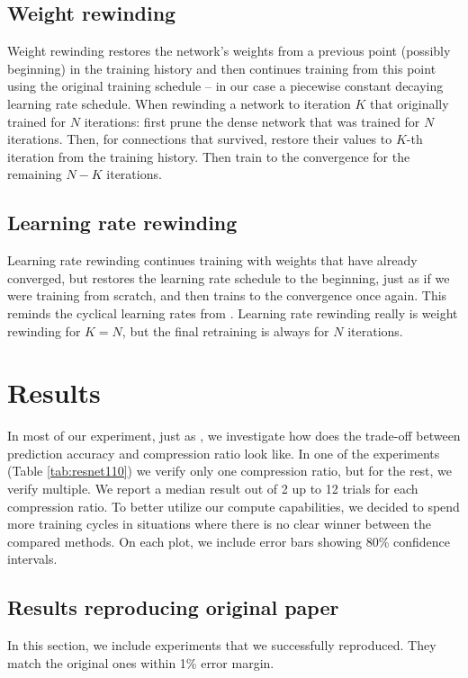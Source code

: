 \subsection{Weight rewinding}
Weight rewinding restores the network's weights from a previous point (possibly beginning) in the training history and then continues training from this point using the original training schedule -- in our case a piecewise constant decaying learning rate schedule.
When rewinding a network to iteration $K$ that originally trained for $N$ iterations: first prune the dense network that was trained for $N$ iterations. Then, for connections that survived, restore their values to $K$-th iteration from the training history. Then train to the convergence for the remaining $N-K$ iterations.

\subsection{Learning rate rewinding}
Learning rate rewinding continues training with weights that have already converged, but restores the learning rate schedule to the beginning, just as if we were training from scratch, and then trains to the convergence once again. This reminds the cyclical learning rates from \cite{cyclical}. Learning rate rewinding really is weight rewinding for $K = N$, but the final retraining is always for $N$ iterations.

\section{Results}
In most of our experiment, just as \cite{Renda}, we investigate how does the trade-off between prediction accuracy and compression ratio look like. 
In one of the experiments (Table \ref{tab:resnet110}) we verify only one compression ratio, but for the rest, we verify multiple.
We report a median result out of 2 up to 12 trials for each compression ratio. To better utilize our compute capabilities, we decided to spend more training cycles in situations where there is no clear winner between the compared methods. On each plot, we include error bars showing 80\% confidence intervals.

\subsection{Results reproducing original paper}

In this section, we include experiments that we successfully reproduced.
They match the original ones within 1\% error margin.

